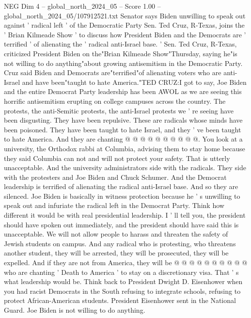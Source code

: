 \begin{textsample}{NEG Dim 4 – global\_north\_2024\_05 – Score 1.00 – global\_north\_2024\_05/107912521.txt}  \label{ex:f4_neg_127}
Senator says Biden unwilling to speak out against ' radical left ' of the Democratic Party Sen.
Ted Cruz, R-Texas, joins the ' Brian Kilmeade Show ' to discuss how President Biden and the Democrats are ' terrified ' of alienating the ' radical anti-Israel base. ' Sen.
Ted Cruz, R-Texas, criticized President Biden on the"Brian Kilmeade Show"Thursday, saying he"is not willing to do anything"about growing antisemitism in the Democratic Party.
Cruz said Biden and Democrats are"terrified"of alienating voters who are anti-Israel and have been"taught to hate America."TED CRUZ:I got to say, Joe Biden and the entire Democrat Party leadership has been AWOL as we are seeing this horrific antisemitism erupting on college campuses across the country.
The protests, the anti-Semitic protests, the anti-Israel protests we ' re seeing have been disgusting.
They have been repulsive.
These are radicals whose minds have been poisoned.
They have been taught to hate Israel, and they ' ve been taught to hate America.
And they are chanting @ @ @ @ @ @ @ @ @ @.
You look at a university, the Orthodox rabbi at Columbia, advising them to stay home because they said Columbia can not and will not protect your safety.
That is utterly unacceptable.
And the university administrators side with the radicals.
They side with the protesters and Joe Biden and Chuck Schumer.
And the Democrat leadership is terrified of alienating the radical anti-Israel base.
And so they are silenced.
Joe Biden is basically in witness protection because he ' s unwilling to speak out and infuriate the radical left in the Democrat Party.
Think how different it would be with real presidential leadership.
I ' ll tell you, the president should have spoken out immediately, and the president should have said this is unacceptable.
We will not allow people to harass and threaten the safety of Jewish students on campus.
And any radical who is protesting, who threatens another student, they will be arrested, they will be prosecuted, they will be expelled.
And if they are not from America, they will be @ @ @ @ @ @ @ @ @ @ who are chanting ' Death to America ' to stay on a discretionary visa.
That ' s what leadership would be.
Think back to President Dwight D.
Eisenhower when you had racist Democrats in the South refusing to integrate schools, refusing to protect African-American students.
President Eisenhower sent in the National Guard.
Joe Biden is not willing to do anything.

\end{textsample}
